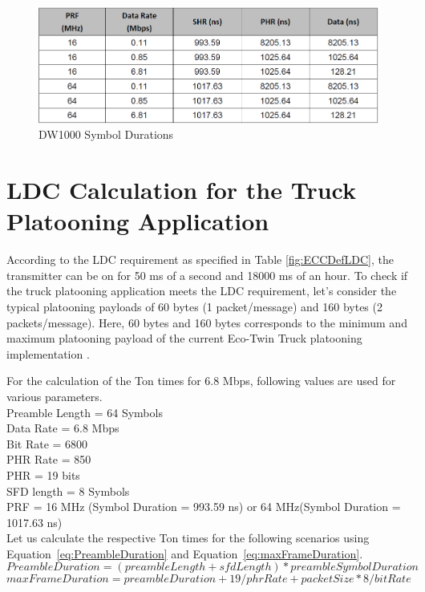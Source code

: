 \begin{figure}[htbp]
    \begin{center}
        \includegraphics[width=1\textwidth]{figures/Picture7.png}
        \caption[DW1000 Symbol Durations]{DW1000 Symbol Durations \protect \cite{DW1000DataSheet}}
        \label{fig:DW1000SymbolDuration}
    \end{center}
\end{figure}

\section{LDC Calculation for the Truck Platooning Application}

According to the LDC requirement as specified in Table \ref{fig:ECCDefLDC}, the transmitter can be on for 50 ms of a second and 18000 ms of an hour. To check if the truck platooning application meets the LDC requirement, let's consider the typical platooning payloads of 60 bytes (1 packet/message) and 160 bytes (2 packets/message). Here, 60 bytes and 160 bytes corresponds to the minimum and maximum platooning payload of the current Eco-Twin Truck platooning implementation \cite{euTPC}.

For the calculation of the Ton times for 6.8 Mbps, following values are used for various parameters.
\vspace{0.2cm}
\\Preamble Length = 64 Symbols \\
Data Rate = 6.8 Mbps \\
Bit Rate = 6800 \\
PHR Rate = 850 \\
PHR = 19 bits \\
SFD length = 8 Symbols \\
PRF = 16 MHz (Symbol Duration = 993.59 ns) or 64 MHz(Symbol Duration = 1017.63 ns)\\

Let us calculate the respective Ton times for the following scenarios using Equation~\ref{eq:PreambleDuration} and Equation~\ref{eq:maxFrameDuration}. 
\begin{equation}
Preamble Duration = (preambleLength + sfdLength)* preambleSymbolDuration
\label{eq:PreambleDuration}
\end{equation}
\begin{equation}
maxFrameDuration = preambleDuration + 19/phrRate + packetSize * 8/ bitRate
\label{eq:maxFrameDuration}
\end{equation}

